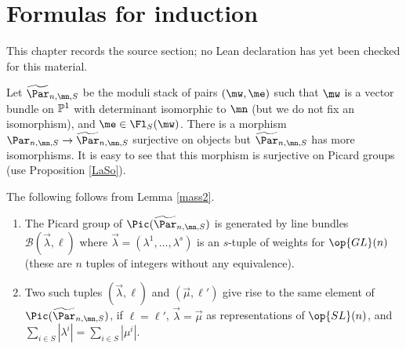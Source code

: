\chapter{Formulas for induction}
\label{rigid-local-systems-multiplicative-eigenvalue-problem-chapter-12}

\begin{remark}
\label{rigid-local-systems-multiplicative-eigenvalue-problem-chapter-12-source}
This chapter records the source section; no Lean declaration has yet been checked for this material.
\notready
\end{remark}

\label{explicitF}
\begin{defi}
\notready
Let $\widetilde{\Par}_{n,\mn,S}$ be the moduli stack of pairs $(\mw,\me)$ such that $\mw$ is a vector bundle on $\Bbb{P}^1$ with determinant isomorphic to $\mn$ (but we do not fix an isomorphism), and $\me\in\Fl_S(\mw)$. There is a morphism ${\Par}_{n,\mn,S}\to\widetilde{\Par}_{n,\mn,S}$ surjective on objects but  $\widetilde{\Par}_{n,\mn,S}$ has more isomorphisms. It is easy to see that this morphism is surjective on Picard groups (use Proposition \ref{LaSo}).
\end{defi}
The following follows from Lemma \ref{mass2}.
\begin{lemma}
\notready
\begin{enumerate}
\item The Picard group of  $\Pic(\widetilde{\Par}_{n,\mn,S})$ is generated  by line bundles $\mathcal{B}(\vec{\lambda},\ell)$ where $\vec{\lambda}=(\lambda^1,\dots,\lambda^s)$ is an $s$-tuple of weights for $\op{GL}(n)$ (these are $n$ tuples of integers without any equivalence).
\item Two such tuples $(\vec{\lambda},\ell)$ and $(\vec{\mu},\ell')$ give rise to the same element of $\Pic(\widetilde{\Par}_{n,\mn,S})$, if $\ell=\ell'$, $\vec{\lambda}=\vec{\mu}$ as representations
of $\op{SL}(n)$, and $\sum_{i\in S}|\lambda^i|=\sum_{i\in S}|\mu^i|$.
\end{enumerate}
\end{lemma}
